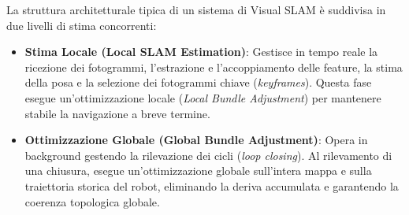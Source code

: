 ﻿\documentclass[11pt, a4paper]{article}
\begin{document}
La struttura architetturale tipica di un sistema di Visual SLAM è suddivisa in due livelli di stima concorrenti:
\begin{itemize}
    \item \textbf{Stima Locale (Local SLAM Estimation)}: Gestisce in tempo reale la ricezione dei fotogrammi, l'estrazione e l'accoppiamento delle feature, la stima della posa e la selezione dei fotogrammi chiave (\emph{keyframes}). Questa fase esegue un'ottimizzazione locale (\emph{Local Bundle Adjustment}) per mantenere stabile la navigazione a breve termine.
    \item \textbf{Ottimizzazione Globale (Global Bundle Adjustment)}: Opera in background gestendo la rilevazione dei cicli (\emph{loop closing}). Al rilevamento di una chiusura, esegue un'ottimizzazione globale sull'intera mappa e sulla traiettoria storica del robot, eliminando la deriva accumulata e garantendo la coerenza topologica globale.
\end{itemize}
\end{document}
